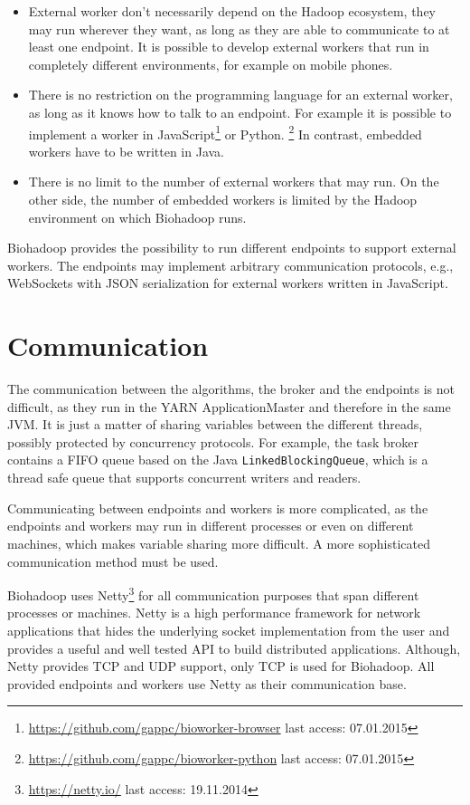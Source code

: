 \begin{itemize}
  \item External worker don't necessarily depend on the Hadoop ecosystem, they may run wherever they want, as long as they are able to communicate to at least one endpoint. It is possible to develop external workers that run in completely different environments, for example on mobile phones.
  \item There is no restriction on the programming language for an external worker, as long as it knows how to talk to an endpoint. For example it is possible to implement a worker in JavaScript\footnote{\url{https://github.com/gappc/bioworker-browser} last access: 07.01.2015} or Python. \footnote{\url{https://github.com/gappc/bioworker-python} last access: 07.01.2015} In contrast, embedded workers have to be written in Java.
  \item There is no limit to the number of external workers that may run. On the other side, the number of embedded workers is limited by the Hadoop environment on which Biohadoop runs.
\end{itemize}

Biohadoop provides the possibility to run different endpoints to support external workers. The endpoints may implement arbitrary communication protocols, e.g., WebSockets with JSON serialization for external workers written in JavaScript.

\section{Communication}
\label{chap:impl:communication}
The communication between the algorithms, the broker and the endpoints is not difficult, as they run in the YARN ApplicationMaster and therefore in the same JVM. It is just a matter of sharing variables between the different threads, possibly protected by concurrency protocols. For example, the task broker contains a FIFO queue based on the Java \texttt{LinkedBlockingQueue}, which is a thread safe queue that supports concurrent writers and readers.
  
Communicating between endpoints and workers is more complicated, as the endpoints and workers may run in different processes or even on different machines, which makes variable sharing more difficult. A more sophisticated communication method must be used.

Biohadoop uses Netty\footnote{\url{https://netty.io/} last access: 19.11.2014} for all communication purposes that span different processes or machines. Netty is a high performance framework for network applications that hides the underlying socket implementation from the user and provides a useful and well tested API to build distributed applications. Although, Netty provides TCP and UDP support, only TCP is used for Biohadoop. All provided endpoints and workers use Netty as their communication base.

